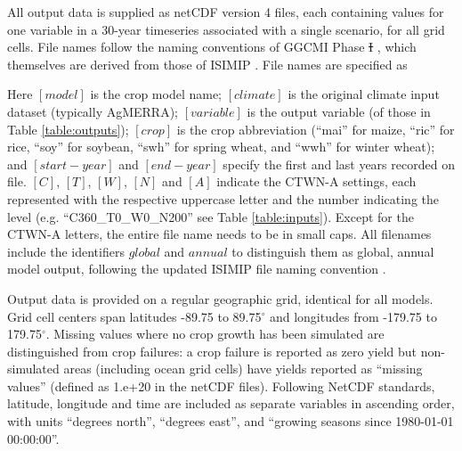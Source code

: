 \documentclass[gmd, manuscript]{copernicus} %
\providecommand{\DIFadd}[1]{{\protect\color{blue}\uwave{#1}}} %
\providecommand{\DIFdel}[1]{{\protect\color{red}\sout{#1}}}                      %
\providecommand{\DIFaddbegin}{} %
\providecommand{\DIFaddend}{} %
\providecommand{\DIFdelbegin}{} %
\providecommand{\DIFdelend}{} %
\begin{document}
All output data is supplied as netCDF version 4 files, each containing values for one variable in a 30-year timeseries associated with a single scenario, for all grid cells. File names follow the naming conventions of GGCMI Phase \DIFdelbegin \DIFdel{I }\DIFdelend \DIFaddbegin \DIFadd{1 }\DIFaddend \citep{Elliott2015}, which themselves are derived from those of ISIMIP \citep{frieler2017assessing}. 
File names are specified as 


\noindent Here $[model]$ is the crop model name; $[climate]$ is the original climate input dataset (typically AgMERRA); $[variable]$ is the output variable (of those in Table \ref{table:outputs}); $[crop]$ is the crop abbreviation (``mai'' for maize, ``ric'' for rice, ``soy'' for soybean, ``swh'' for spring wheat, and ``wwh'' for winter wheat); and $[start-year]$ and $[end-year]$ specify the first and last years recorded on file.
$[C]$, $[T]$, $[W]$, $[N]$ and $[A]$ indicate the CTWN-A settings, each represented with the respective uppercase letter and the number indicating the level (e.g. ``C360\_T0\_W0\_N200'' see Table \ref{table:inputs}). 
Except for the CTWN-A letters, the entire file name needs to be in small caps. 
All filenames include the identifiers $global$ and $annual$ to distinguish them as global, annual model output, following the updated ISIMIP file naming convention \citep{frieler2017assessing}.

Output data is provided on a regular geographic grid, identical for all models. 
Grid cell centers span latitudes -89.75 to 89.75$^{\circ}$ and longitudes from -179.75 to 179.75$^{\circ}$. 
Missing values where no crop growth has been simulated are distinguished from crop failures: a crop failure is reported as zero yield but non-simulated areas (including ocean grid cells) have yields reported as ``missing values'' (defined as 1.e+20 in the netCDF files). 
Following NetCDF standards, latitude, longitude and time are included as separate variables in ascending order, with
units ``degrees north'', ``degrees east'', and ``growing seasons since 1980-01-01 00:00:00''. 
\end{document}
